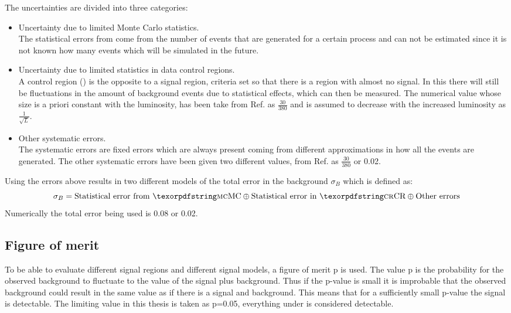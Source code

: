 The uncertainties are divided into three categories:
\begin{itemize}
\item Uncertainty due to limited Monte Carlo statistics. \\
The statistical errors from \abbrMC come from the number of events that are generated for a certain process and can not be estimated since it is not known how many events which will be simulated in the future.

\item Uncertainty due to limited statistics in data control regions.\\
A control region (\abbrCR) is the opposite to a signal region,  criteria set so that there is a region with almost no signal. In this \abbrCR there will still be fluctuations in the amount of background events due to statistical effects, which can then be measured. The numerical value whose size is a priori constant with the luminosity, has been take from Ref. \citep{ATLAS-CONF-2012-147} as $\frac{30}{380}$ and is assumed to decrease with the increased luminosity as $\frac{1}{\sqrt{L}}$.

\item Other systematic errors.\\
The systematic errors are fixed errors which are always present coming from different approximations in how all the events are generated. The other systematic errors have been given two different values, from Ref. \citep{ATLAS-CONF-2012-147} as $\frac{30}{380}$ or 0.02.
\end{itemize}

Using the errors above results in two different models of the total error in the background $\sigma_B$ which is defined as:
\begin{equation*}
\sigma_B = \text{Statistical error from \abbrMC} \oplus \text{Statistical error in \abbrCR} \oplus \text{Other errors}
\end{equation*}
Numerically the total error being used is 0.08 or 0.02. 

\subsection{Figure of merit}\label{subsec:figmer}
To be able to evaluate different signal regions and different signal models, a figure of merit p is used. The value p is the probability for the observed background to fluctuate to the value of the signal plus background. Thus if the p-value is small it is improbable that the observed background could result in the same value as if there is a signal and background. This means that for a sufficiently small p-value the signal is detectable. The limiting value in this thesis is taken as p=0.05, everything under is considered detectable. 

